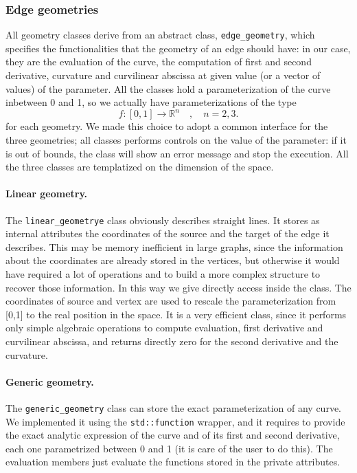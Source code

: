 \documentclass[11pt]{article} %
\newcommand{\classname}[1]{\texttt{#1}}
\begin{document}
		\subsubsection{Edge geometries}
		All geometry classes derive from an abstract class, \classname{edge\_geometry}, which specifies the functionalities that the geometry of an edge should have: in our case, they are the evaluation of the curve, the computation of first and second derivative, curvature and curvilinear abscissa at given value (or a vector of values) of the parameter. All the classes hold a parameterization of the curve inbetween 0 and 1, so we actually have parameterizations of the type
		\begin{equation*}
			f:[0,1]\rightarrow\mathbb{R}^{n} \quad, \quad n=2,3.
		\end{equation*}
		for each geometry. We made this choice to adopt a common interface for the three geometries; all classes performs controls on the value of the parameter: if it is out of bounds, the class will show an error message and stop the execution. All the three classes are templatized on the dimension of the space.
		\paragraph{Linear geometry.} The \classname{linear\_geometrye} class obviously describes straight lines. It stores as internal attributes the coordinates of the source and the target of the edge it describes. This may be memory inefficient in large graphs, since the information about the coordinates are already stored in the vertices, but otherwise it would have required a lot of operations and to build a more complex structure to recover those information. In this way we give directly access inside the class. The coordinates of source and vertex are used to rescale the parameterization from [0,1] to the real position in the space. It is a very efficient class, since it performs only simple algebraic operations to compute evaluation, first derivative and curvilinear abscissa, and returns directly zero for the second derivative and the curvature.
		\paragraph{Generic geometry.} The \classname{generic\_geometry} class can store the exact parameterization of any curve. We implemented it using the \texttt{std::function} wrapper, and it requires to provide the exact analytic expression of the curve and of its first and second derivative, each one parametrized between 0 and 1 (it is care of the user to do this). The evaluation members just evaluate the functions stored in the private attributes.
\end{document}
